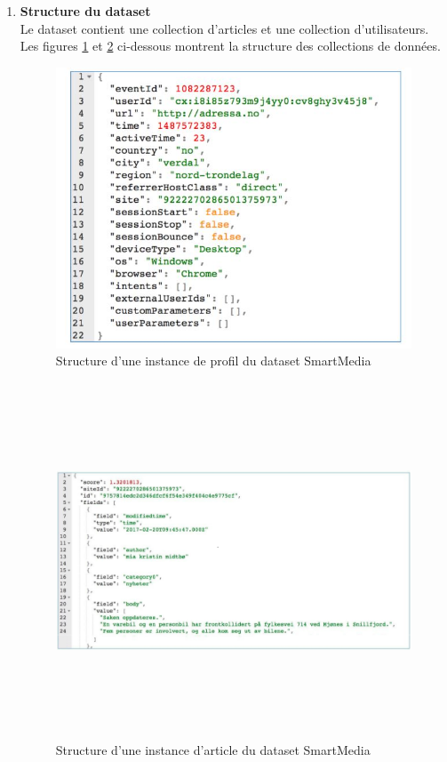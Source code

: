     \begin{enumerate}[leftmargin=*]
        \item\textbf{Structure du dataset}\\
        Le dataset contient une collection d'articles et une collection d'utilisateurs. Les figures \ref{instance-profil} et \ref{instance-article} ci-dessous montrent la structure des collections de données.
        \begin{figure}[H]
            \centering
            \includegraphics[width=350pt]{img/chapter4/smartmedia/structure_profil.jpg}
            \caption{Structure d'une instance de profil du dataset SmartMedia}
            \label{instance-profil}
        \end{figure}
        
        \begin{figure}[H]
            \centering
            \includegraphics[height=300pt, width=425pt]{img/chapter4/smartmedia/structure.png}
            \caption{Structure d'une instance d'article du dataset SmartMedia}
            \label{instance-article}
        \end{figure}


\end{enumerate}
